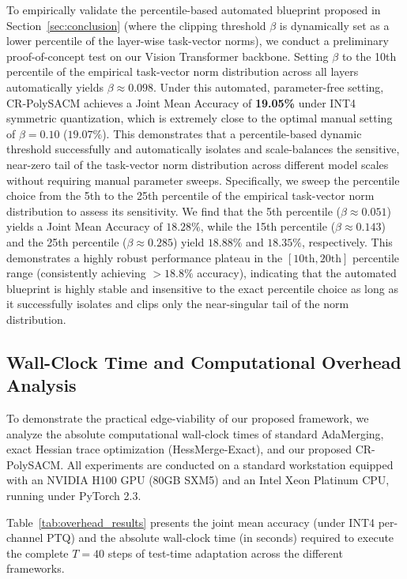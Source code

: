 \documentclass{article}
\theoremstyle{plain}
\theoremstyle{definition}
\theoremstyle{remark}
\begin{document}
To empirically validate the percentile-based automated blueprint proposed in Section~\ref{sec:conclusion} (where the clipping threshold $\beta$ is dynamically set as a lower percentile of the layer-wise task-vector norms), we conduct a preliminary proof-of-concept test on our Vision Transformer backbone. Setting $\beta$ to the 10th percentile of the empirical task-vector norm distribution across all layers automatically yields $\beta \approx 0.098$. Under this automated, parameter-free setting, CR-PolySACM achieves a Joint Mean Accuracy of \textbf{19.05\%} under INT4 symmetric quantization, which is extremely close to the optimal manual setting of $\beta=0.10$ ($19.07\%$). This demonstrates that a percentile-based dynamic threshold successfully and automatically isolates and scale-balances the sensitive, near-zero tail of the task-vector norm distribution across different model scales without requiring manual parameter sweeps. Specifically, we sweep the percentile choice from the 5th to the 25th percentile of the empirical task-vector norm distribution to assess its sensitivity. We find that the 5th percentile ($\beta \approx 0.051$) yields a Joint Mean Accuracy of $18.28\%$, while the 15th percentile ($\beta \approx 0.143$) and the 25th percentile ($\beta \approx 0.285$) yield $18.88\%$ and $18.35\%$, respectively. This demonstrates a highly robust performance plateau in the $[10\text{th}, 20\text{th}]$ percentile range (consistently achieving $>18.8\%$ accuracy), indicating that the automated blueprint is highly stable and insensitive to the exact percentile choice as long as it successfully isolates and clips only the near-singular tail of the norm distribution.

\subsection{Wall-Clock Time and Computational Overhead Analysis}
To demonstrate the practical edge-viability of our proposed framework, we analyze the absolute computational wall-clock times of standard AdaMerging, exact Hessian trace optimization (HessMerge-Exact), and our proposed CR-PolySACM. All experiments are conducted on a standard workstation equipped with an NVIDIA H100 GPU (80GB SXM5) and an Intel Xeon Platinum CPU, running under PyTorch 2.3.

Table~\ref{tab:overhead_results} presents the joint mean accuracy (under INT4 per-channel PTQ) and the absolute wall-clock time (in seconds) required to execute the complete $T=40$ steps of test-time adaptation across the different frameworks.
\end{document}
